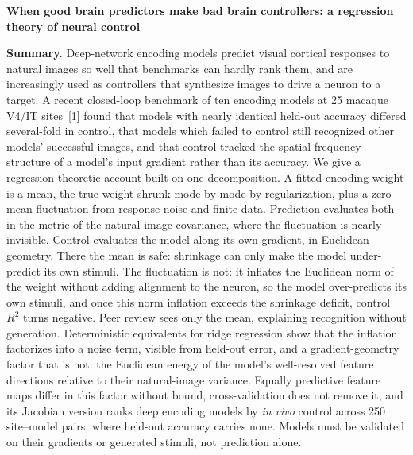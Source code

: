 \documentclass[12pt,letterpaper]{article}
\begin{document}
{\large\bfseries When good brain predictors make bad brain controllers: a regression theory of neural control\par}
\vspace{2pt}

\textbf{Summary.}
Deep-network encoding models predict visual cortical responses to natural images so well that benchmarks can hardly rank them, and are increasingly used as controllers that synthesize images to drive a neuron to a target. A recent closed-loop benchmark of ten encoding models at 25 macaque V4/IT sites~[1] found that models with nearly identical held-out accuracy differed several-fold in control, that models which failed to control still recognized other models' successful images, and that control tracked the spatial-frequency structure of a model's input gradient rather than its accuracy. We give a regression-theoretic account built on one decomposition. A fitted encoding weight is a mean, the true weight shrunk mode by mode by regularization, plus a zero-mean fluctuation from response noise and finite data. Prediction evaluates both in the metric of the natural-image covariance, where the fluctuation is nearly invisible. Control evaluates the model along its own gradient, in Euclidean geometry. There the mean is safe: shrinkage can only make the model under-predict its own stimuli. The fluctuation is not: it inflates the Euclidean norm of the weight without adding alignment to the neuron, so the model over-predicts its own stimuli, and once this norm inflation exceeds the shrinkage deficit, control $R^2$ turns negative. Peer review sees only the mean, explaining recognition without generation. Deterministic equivalents for ridge regression show that the inflation factorizes into a noise term, visible from held-out error, and a gradient-geometry factor that is not: the Euclidean energy of the model's well-resolved feature directions relative to their natural-image variance. Equally predictive feature maps differ in this factor without bound, cross-validation does not remove it, and its Jacobian version ranks deep encoding models by \emph{in vivo} control across 250 site--model pairs, where held-out accuracy carries none. Models must be validated on their gradients or generated stimuli, not prediction alone.
\end{document}
